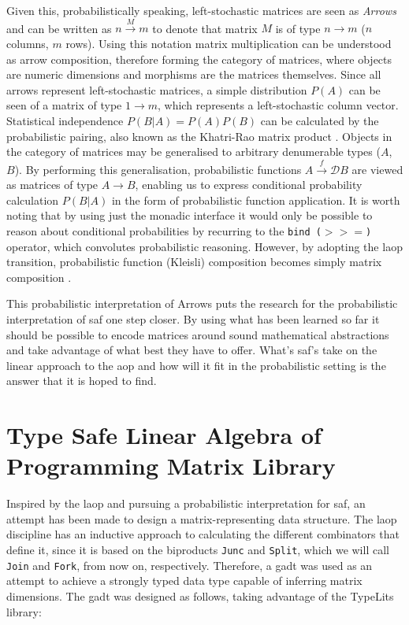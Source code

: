 \documentclass[
  oneside,
  11pt, a4paper,
  footinclude=true,
  headinclude=true,
  cleardoublepage=empty
]{scrbook}
\theoremstyle{definition}
\theoremstyle{definition}
\begin{document}
	        Given this, probabilistically speaking, left-stochastic matrices are seen as \emph{Arrows} and can be written as $n \xrightarrow{M} m$ to denote that matrix $M$ is of type $n \longrightarrow m$ ($n$ columns, $m$ rows). Using this notation matrix multiplication can be understood as arrow composition, therefore forming the category of matrices, where objects are numeric dimensions and morphisms are the matrices themselves. Since all arrows represent left-stochastic matrices, a simple distribution $P(A)$ can be seen of a matrix of type $1 \longrightarrow m$, which represents a left-stochastic column vector. Statistical independence $P(B|A) = P(A)P(B)$ can be calculated by the probabilistic pairing, also known as the Khatri-Rao matrix product \citep{Macedo2012MatricesAA, murta2013calculating}. Objects in the category of matrices may be generalised to arbitrary denumerable types ($A$, $B$). By performing this generalisation, probabilistic functions $A \xrightarrow{f} \mathscr{D}B$ are viewed as matrices of type $A \longrightarrow B$, enabling us to express conditional probability calculation $P(B|A)$ in the form of probabilistic function application. It is worth noting that by using just the monadic interface it would only be possible to reason about conditional probabilities by recurring to the \texttt{bind ($>>=$)} operator, which convolutes probabilistic reasoning. However, by adopting the \gls{laop} transition, probabilistic function (Kleisli) composition becomes simply matrix composition \citep{oliveira2012towards}.
	        
	        This probabilistic interpretation of Arrows puts the research for the probabilistic interpretation of \gls{saf} one step closer. By using what has been learned so far it should be possible to encode matrices around sound mathematical abstractions and take advantage of what best they have to offer. What's \gls{saf}'s take on the linear approach to the \gls{aop} and how will it fit in the probabilistic setting is the answer that it is hoped to find.
	    
	    \section{Type Safe Linear Algebra of Programming Matrix Library}\label{sec-laop-lib1}
	    
	    Inspired by the \gls{laop} and pursuing a probabilistic interpretation for \gls{saf}, an attempt has been made to design a matrix-representing data structure. The \gls{laop} discipline has an inductive approach to calculating the different combinators that define it, since it is based on the biproducts \texttt{Junc} and \texttt{Split}, which we will call \texttt{Join} and \texttt{Fork}, from now on, respectively. Therefore, a \gls{gadt} was used as an attempt to achieve a strongly typed data type capable of inferring matrix dimensions. The \gls{gadt} was designed as follows, taking advantage of the TypeLits library:
	    
\end{document}
